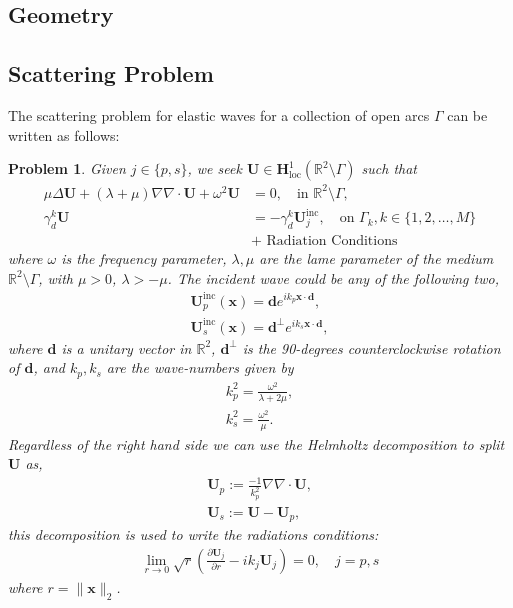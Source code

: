 \documentclass{article}
\newtheorem{problem}[theorem]{Problem}
\newcommand{\vx}{\bm{x}}
\newcommand{\IR}{{\mathbb R}}
\begin{document}
\subsection{Geometry}
\subsection{Scattering Problem}



The scattering problem for elastic waves for a collection of open arcs $\Gamma$ can be written as follows: 

\begin{problem}
\label{prob:VolProb}
Given $j \in \{p,s\}$, we seek $ \mathbf{U} \in \mathbb{\mathbf{H}}^1_\text{loc}(\mathbb{R}^2\setminus \Gamma)$ such that  
\begin{align*}
\mu \Delta \mathbf{U}+ (\lambda +\mu) \nabla \nabla \cdot \mathbf{U} + \omega^2 \mathbf{U} &= 0, \quad \text{in } \mathbb{R}^2\setminus \Gamma, \\
\gamma^k_d \mathbf{U} &= -\gamma^k_d \mathbf{U}^\text{inc}_j, \quad \text{on } \Gamma_k, k \in \{1,2,\hdots, M\} \\
&\text{+ Radiation Conditions} 
\end{align*}
where $\omega$ is the frequency parameter, $\lambda , \mu $ are the lame parameter of the medium $\mathbb{R}^2\setminus \Gamma$, with $\mu >0$, $\lambda > -\mu$. The incident wave could be any of the following two, 
\begin{align*}
\mathbf{U}^\text{inc}_p(\mathbf{x}) = \mathbf{d} e^{i k_p \mathbf{x} \cdot \mathbf{d}}, \\
\mathbf{U}^\text{inc}_s(\mathbf{x}) = \mathbf{d}^\perp e^{i k_s \mathbf{x} \cdot \mathbf{d}},
\end{align*}
where $\mathbf{d}$ is a unitary vector in $\IR^2$, $\mathbf{d}^\perp$ is the 90-degrees counterclockwise rotation of $\mathbf{d}$, and $k_p, k_s$ are the wave-numbers given by 
\begin{align*}
k_p^2 = \frac{\omega^2}{\lambda+2\mu}, \\
k_s^2 = \frac{\omega^2}{\mu}.   
\end{align*}
Regardless of the right hand side we can use the Helmholtz decomposition to split $\mathbf{U}$ as, 
\begin{align*}
\mathbf{U}_p := \frac{-1}{k^2_p}\nabla \nabla \cdot \mathbf{U}, \\
\mathbf{U}_s := \mathbf{U} - \mathbf{U}_p,
\end{align*} 
this decomposition is used to write the radiations conditions: 
\begin{align*}
\lim_{r \rightarrow 0}\sqrt{r} \left(   
\frac{\partial \mathbf{U}_j }{\partial r}- i k_j \mathbf{U}_j
\right) = 0 ,\quad j = p,s
\end{align*}
where $r = \|\vx\|_2$. 
\end{problem} 
\end{document}
